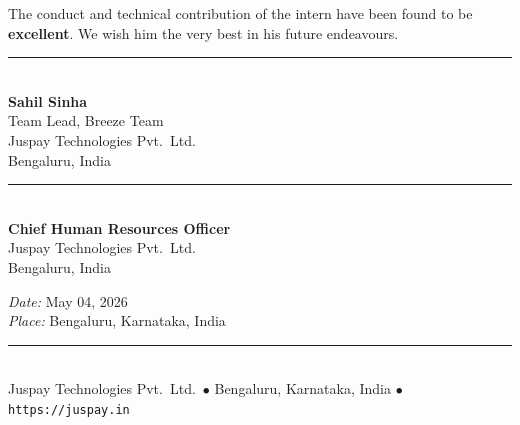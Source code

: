 \vspace{3mm}
\noindent
The conduct and technical contribution of the intern have been found to be \textbf{excellent}. We wish him the very best in his future endeavours.

\vspace{10mm}

\noindent
\begin{minipage}[t]{0.45\linewidth}
  \begin{flushleft}
    \rule{55mm}{0.4pt}\\[1mm]
    \textbf{Sahil Sinha}\\
    Team Lead, Breeze Team\\
    Juspay Technologies Pvt.\ Ltd.\\
    Bengaluru, India
  \end{flushleft}
\end{minipage}
\hfill
\begin{minipage}[t]{0.45\linewidth}
  \begin{flushright}
    \rule{55mm}{0.4pt}\\[1mm]
    \textbf{Chief Human Resources Officer}\\
    Juspay Technologies Pvt.\ Ltd.\\
    Bengaluru, India
  \end{flushright}
\end{minipage}

\vspace{10mm}

\begin{flushleft}
  \textit{Date:} May 04, 2026\\
  \textit{Place:} Bengaluru, Karnataka, India
\end{flushleft}

\vspace*{\fill}
\noindent\rule{\textwidth}{0.4pt}\\[1mm]
{\small Juspay Technologies Pvt.\ Ltd.\ $\bullet$ Bengaluru, Karnataka, India $\bullet$ \texttt{https://juspay.in}}

\cleardoublepage
